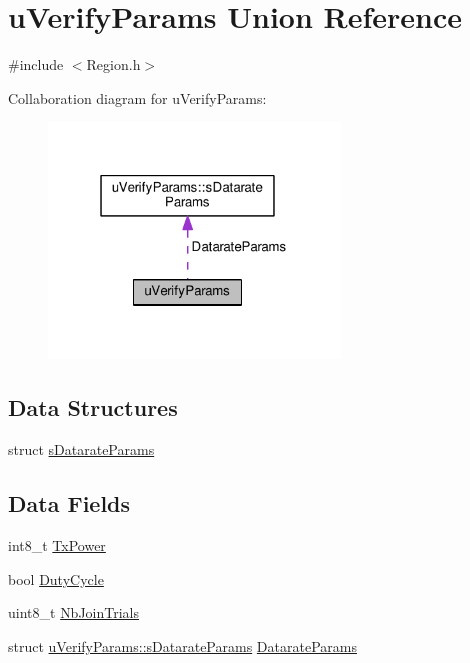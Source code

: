 \hypertarget{unionuVerifyParams}{}\section{u\+Verify\+Params Union Reference}
\label{unionuVerifyParams}


{\ttfamily \#include $<$Region.\+h$>$}



Collaboration diagram for u\+Verify\+Params\+:
\nopagebreak
\begin{figure}[H]
\begin{center}
\leavevmode
\includegraphics[width=220pt]{unionuVerifyParams__coll__graph}
\end{center}
\end{figure}
\subsection*{Data Structures}
\begin{DoxyCompactItemize}
\item 
struct \hyperlink{structuVerifyParams_1_1sDatarateParams}{s\+Datarate\+Params}
\end{DoxyCompactItemize}
\subsection*{Data Fields}
\begin{DoxyCompactItemize}
\item 
int8\+\_\+t \hyperlink{unionuVerifyParams_ab7a938258025172a2bf48649f8712135}{Tx\+Power}
\item 
bool \hyperlink{unionuVerifyParams_ac1269ec12fcd5a8ab262a4edabf6375a}{Duty\+Cycle}
\item 
uint8\+\_\+t \hyperlink{unionuVerifyParams_ac6a44915b13785f37b901650378c7854}{Nb\+Join\+Trials}
\item 
struct \hyperlink{structuVerifyParams_1_1sDatarateParams}{u\+Verify\+Params\+::s\+Datarate\+Params} \hyperlink{unionuVerifyParams_acfc77eaccff61ecbe9396785f107655a}{Datarate\+Params}
\end{DoxyCompactItemize}


